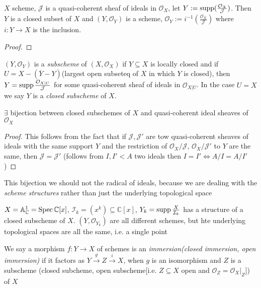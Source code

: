 \documentclass[main]{subfiles}
\begin{document}
\clubsuit\quad $X$ scheme, $\mathcal J$ is a quasi-coherent sheaf of ideals in $\mathcal O_X$, let $Y:=\operatorname{supp}(\frac{\mathcal O_X}{\mathcal J})$. Then $Y$ is a closed subset of $X$ and $(Y,\mathcal O_Y)$ is a scheme, $\mathcal O_Y:=i^{-1}(\frac{\mathcal O_X}{\mathcal J})$ where $i:Y\to X$ is the inclusion.

\begin{proof}

\end{proof}

\begin{definition}
$(Y,\mathcal O_Y)$ is a \textit{subscheme} of $(X,\mathcal O_X)$ if $Y\subseteq X$ is locally closed and if $U=X-(\overline{Y}-Y)$(largest open subseteq of $X$ in which $Y$ is closed), then $Y=\operatorname{supp}\frac{\mathcal O_{X|U}}{\mathcal J}$ for some quasi-coherent sheaf of ideals in $\mathcal O_{X|U}$. In the case $U=X$ we say $Y$ is a \textit{closed subscheme} of $X$.
\end{definition}

\clubsuit\quad $\exists$ bijection between closed subschemes of $X$ and quasi-coherent ideal sheaves of $\mathcal O_X$

\begin{proof}
This follows from the fact that if $\mathcal J,\mathcal J'$ are tow quasi-coherent sheaves of ideals with the same support $Y$ and the restriction of $\mathcal O_X/\mathcal J$, $\mathcal O_X/\mathcal J'$ to $Y$ are the same, then $\mathcal J=\mathcal J'$ (follows from $I,I'<A$ two ideals then $I=I'\iff A/I=A/I'$)
\end{proof}

\begin{remark}
This bijection we should not the radical of ideals, because we are dealing with the \textit{scheme structures} rather than just the underlying topological space
\end{remark}

\begin{example}
$X=\mathbb A_{\mathbb C}^1=\operatorname{Spec}\mathbb C[x]$, $\mathcal I_k=(x^k)\subseteq\mathbb C[x]$, $Y_k=\operatorname{supp}\frac{X}{\mathcal I_k}$ has a structure of a closed subscheme of $X$. $(Y,\mathcal O_{Y_k})$ are all different schemes, but hte underlying topological spaces are all the same, i.e. a single point
\end{example}

\begin{definition}
We say a morphism $f:Y\to X$ of schemes is an \textit{immersion(closed immersion, open immersion)} if it factors as $Y\xrightarrow{g}Z\xrightarrow{i}X$, when $g$ is an isomorphism and $Z$ is a subscheme (closed subcheme, open subscheme[i.e. $Z\subseteq X$ open and $\mathcal O_Z=\mathcal O_X|_Z$]) of $X$
\end{definition}
\end{document}
